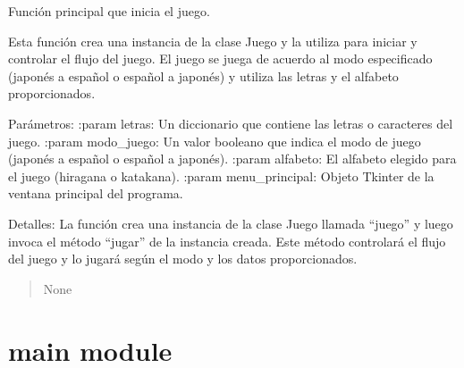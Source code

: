 \documentclass[letterpaper,10pt,spanish]{sphinxmanual}
\begin{document}
\begin{fulllineitems}
\label{\detokenize{juego:juego.main}}
\pysigstartsignatures
{}
\pysigstopsignatures
\sphinxAtStartPar
Función principal que inicia el juego.

\sphinxAtStartPar
Esta función crea una instancia de la clase Juego y la utiliza para iniciar
y controlar el flujo del juego. El juego se juega de acuerdo al modo especificado
(japonés a español o español a japonés) y utiliza las letras y el alfabeto
proporcionados.

\sphinxAtStartPar
Parámetros:
:param letras: Un diccionario que contiene las letras o caracteres del juego.
:param modo\_juego: Un valor booleano que indica el modo de juego (japonés a español o español a japonés).
:param alfabeto: El alfabeto elegido para el juego (hiragana o katakana).
:param menu\_principal: Objeto Tkinter de la ventana principal del programa.

\sphinxAtStartPar
Detalles:
La función crea una instancia de la clase Juego llamada “juego” y luego invoca el método
“jugar” de la instancia creada. Este método controlará el flujo del juego y lo jugará según
el modo y los datos proporcionados.
\begin{quote}\begin{description}
\sphinxAtStartPar
None

\end{description}\end{quote}

\end{fulllineitems}


\sphinxstepscope


\chapter{main module}
\label{\detokenize{main:module-main}}\label{\detokenize{main:main-module}}\label{\detokenize{main::doc}}
\end{document}
